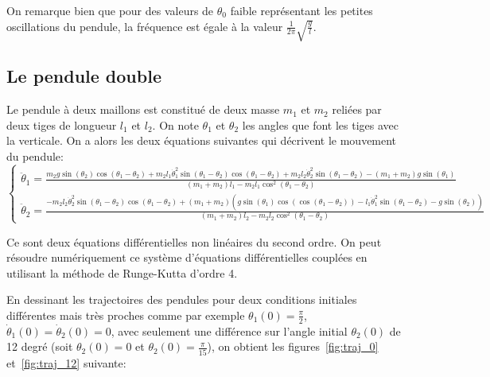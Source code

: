 \documentclass{article}
\begin{document}
\bigskip

On remarque bien que pour des valeurs de $ \theta_{0} $ faible représentant les petites oscillations du pendule, 
la fréquence est égale à la valeur $ \frac{1}{2 \pi} \sqrt{\frac{g}{l}} $.

\subsection*{Le pendule double} Le pendule à deux maillons est constitué de deux masse $ m_{1} $ et $ m_{2} $ 
reliées par deux tiges de longueur $ l_{1} $ et $ l _{2} $. On note $ \theta_{1} $ et $ \theta_{2} $ les angles
que font les tiges avec la verticale. On a alors les deux équations suivantes qui décrivent le mouvement du pendule:
\begin{equation}
    \begin{cases}
        \ddot \theta_{1} = \frac{m_{2} g \sin(\theta_{2}) \cos(\theta_{1} - \theta_{2}) + m_{2} l_{1} \dot \theta_{1}^{2} \sin(\theta_{1} - \theta_{2}) \cos(\theta_{1} - \theta_{2}) + m_{2} l_{2} \dot \theta_{2}^{2} \sin(\theta_{1} - \theta_{2}) - (m_{1} + m_{2}) g \sin(\theta_{1})}{(m_{1} + m_{2}) l_{1} - m_{2} l_{1} \cos^{2}(\theta_{1} - \theta_{2})}  \\ \nonumber
        \ddot \theta_{2} = \frac{- m_{2} l_{2} \dot \theta_{2}^{2} \sin(\theta_{1} - \theta_{2}) \cos(\theta_{1} - \theta_{2}) + (m_{1} + m_{2}) (g \sin(\theta_{1}) \cos( \cos(\theta_{1} - \theta_{2})) - l_{1} \dot \theta_{1}^{2} \sin(\theta_{1} - \theta_{2}) - g \sin(\theta_{2}))}{(m_{1} + m_{2}) l_{2} - m_{2} l_{2} \cos^{2}(\theta_{1} - \theta_{2})}  
    \end{cases}
    \label{eq:pendule_2_maillons}
\end{equation}

Ce sont deux équations différentielles non linéaires du second ordre. 
On peut résoudre numériquement ce système d'équations différentielles couplées en utilisant la méthode de Runge-Kutta d'ordre 4.

\bigskip

En dessinant les trajectoires des pendules pour deux conditions initiales différentes mais très proches comme par exemple 
$ \theta_{1}(0) = \frac{\pi}{2} $, $ \dot \theta_{1}(0) = \dot \theta_{2}(0) = 0 $, avec seulement une différence sur l'angle initial $ \theta_{2}(0) $ de 12 degré (soit $ \theta_{2}(0) = 0 $ et $ \theta_{2}(0) = \frac{\pi}{15} $),
on obtient les figures~\ref{fig:traj_0} et~\ref{fig:traj_12} suivante:
\end{document}
